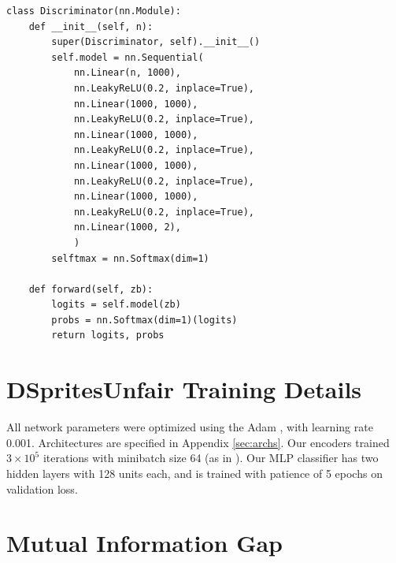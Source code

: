 {\begin{verbatim}
class Discriminator(nn.Module):
    def __init__(self, n):
        super(Discriminator, self).__init__()
        self.model = nn.Sequential(
            nn.Linear(n, 1000),
            nn.LeakyReLU(0.2, inplace=True),
            nn.Linear(1000, 1000),
            nn.LeakyReLU(0.2, inplace=True),
            nn.Linear(1000, 1000),
            nn.LeakyReLU(0.2, inplace=True),
            nn.Linear(1000, 1000),
            nn.LeakyReLU(0.2, inplace=True),
            nn.Linear(1000, 1000),
            nn.LeakyReLU(0.2, inplace=True),
            nn.Linear(1000, 2),
            )
        selftmax = nn.Softmax(dim=1)

    def forward(self, zb):
        logits = self.model(zb)
        probs = nn.Softmax(dim=1)(logits)
        return logits, probs
\end{verbatim}
}

\section{DSpritesUnfair Training Details}\label{sec:dsprites-training-details}
All network parameters were optimized using the Adam \citep{kingma2014adam}, with learning rate 0.001.
Architectures are specified in Appendix \ref{sec:archs}.
Our encoders trained $3 \times 10^5$ iterations with minibatch size 64 (as in \citet{kim2018disentangling}).
Our MLP classifier has two hidden layers with 128 units each, and is trained with patience of 5 epochs on validation loss.

\section{Mutual Information Gap} \label{sec:mig}
